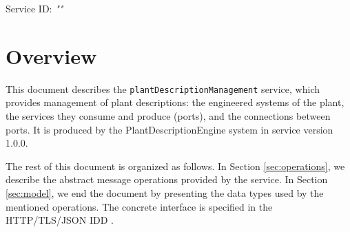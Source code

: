 \documentclass[a4paper]{arrowhead}
\begin{document}
\sloppy

\ArrowheadSetup

\begin{center}
  \vspace*{1cm}
  \huge{\arrowtitle}

  \vspace*{0.2cm}
  \LARGE{\arrowtype}
  \vspace*{1cm}

  \Large{Service ID: \textit{"\arrowid"}}

  \vspace*{\fill}


  \vspace*{1cm}
  \vspace*{\fill}

  \begin{abstract}
    This document describes the \texttt{plant\allowbreak{}Description\allowbreak{}Management} service, version 1.0.0, produced by the PlantDescriptionEngine support system of Arrowhead 5.2.2.
  \end{abstract}

  \vspace*{1cm}
\end{center}

\newpage

\tableofcontents
\newpage

\section{Overview}
\label{sec:overview}

This document describes the \texttt{plant\allowbreak{}Description\allowbreak{}Management} service, which provides management of plant descriptions: the engineered systems of the plant, the services they consume and produce (ports), and the connections between ports.
It is produced by the PlantDescriptionEngine system \cite{pde-sysd} in service version 1.0.0.

The rest of this document is organized as follows.
In Section \ref{sec:operations}, we describe the abstract message operations provided by the service.
In Section \ref{sec:model}, we end the document by presenting the data types used by the mentioned operations.
The concrete interface is specified in the HTTP/TLS/JSON IDD \cite{pde-plantDescriptionManagement-http-idd}.
\end{document}
